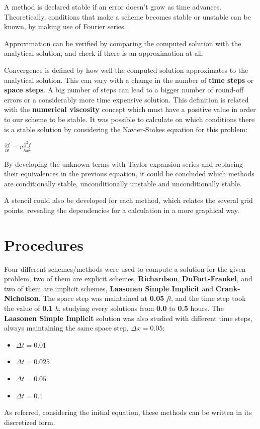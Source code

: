 \documentclass[12pt]{report}
\begin{document}
\par A method is declared stable if an error doesn't grow as time advances. Theoretically, conditions that make a scheme becomes stable or unstable can be known, by making use of Fourier series.
\par Approximation can be verified by comparing the computed solution with the analytical solution, and check if there is an approximation at all.
\par Convergence is defined by how well the computed solution approximates to the analytical solution. This can vary with a change in the number of \textbf{time steps} or \textbf{space steps}. A big number of steps can lead to a bigger number of round-off errors or a considerably more time expensive solution. This definition is related with the \textbf{numerical viscosity} concept which must have a positive value in order to our scheme to be stable. It was possible to calculate on which conditions there is a stable solution by considering the Navier-Stokes equation for this problem:
\begin{center}
\large
$
\frac{\partial f}{\partial t} = v\frac{\partial ^2f}{\partial x ^2}
$
\end{center}
\par By developing the unknown terms with Taylor expansion series and replacing their equivalences in the previous equation, it could be concluded which methods are conditionally stable, unconditionally unstable and unconditionally stable.
\par A stencil could also be developed for each method, which relates the several grid points, revealing the dependencies for a calculation in a more graphical way. 
\section*{Procedures}
Four different schemes/methods were used to compute a solution for the given problem, two of them are explicit schemes, \textbf{Richardson}, \textbf{DuFort-Frankel}, and two of them are implicit schemes, \textbf{Laasonen Simple Implicit} and \textbf{Crank-Nicholson}. The space step was maintained at \textbf{0.05} \textit{ft}, and the time step took the value of \textbf{0.1} \textit{h}, studying every solutions from \textbf{0.0} to \textbf{0.5} hours. The \textbf{Laasonen Simple Implicit} solution was also studied with different time steps, always maintaining the same space step,  \textbf{$\Delta x = 0.05$}:
\begin{itemize}[noitemsep] 
\item $ \Delta t = 0.01 $
\item $ \Delta t = 0.025 $
\item $ \Delta t = 0.05 $
\item $ \Delta t = 0.1 $
\end{itemize}
As referred, considering the initial equation, these methods can be written in its discretized form.
\end{document}
